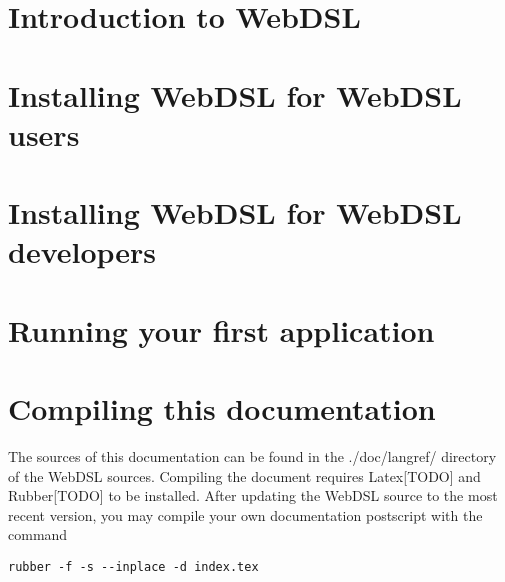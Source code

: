\chapter{Introduction to WebDSL}


\chapter[installuser]{Installing WebDSL for WebDSL users}


\chapter{Installing WebDSL for WebDSL developers}


\chapter[firstapp]{Running your first application }


\chapter{Compiling this documentation}
The sources of this documentation can be found in the ./doc/langref/ directory of the WebDSL sources. Compiling the document requires Latex[TODO] and Rubber[TODO] to be installed. After updating the WebDSL source to the most recent version, you may compile your own documentation postscript with the command
\begin{lstlisting}
rubber -f -s --inplace -d index.tex
\end{lstlisting}

